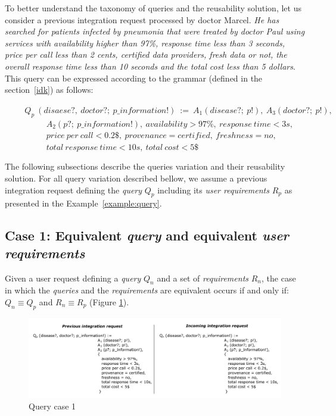 \begin{example}\label{example:query}
To better understand the taxonomy of queries and the reusability solution, let us consider a previous integration request processed by doctor Marcel. \textit{He has searched for patients infected by pneumonia that were treated by doctor Paul using services with availability higher than 97\%, response time less than 3 seconds, price per call less than 2 cents, certified data providers, fresh data or not, the overall response time less than 10 seconds and the total cost less than 5 dollars}. This query can be expressed according to the grammar (defined in the section~\ref{idk}) as follows:
\begin{flushleft}
$\hspace{1cm} Q_{p} \ (disaese?, \ doctor?; \ p\_information!) \ := \ A_{1} (disease?; \ p!), \ A_{3} (doctor?; \ p!),$ \\ 
$ \hspace{2cm} \ A_{2} (p?; \ p\_information!), \ availability > 97\%, \ response \ time < 3s,$ \\ 
$ \hspace{2cm} \ price \ per \ call < 0.2\$, \ provenance = certified, \ freshness = no,$ \\ 
$ \hspace{2cm} \ total \ response \ time < 10s, \ total \ cost < 5\$$
\end{flushleft}
\end{example}
 
The following subsections describe the queries variation and their reusability solution. For all query variation described bellow, we assume a previous integration request defining the \textsl{query} $Q_{p}$ including its \textsl{user requirements} $R_{p}$ as presented in the Example~\ref{example:query}.

\subsection{Case 1: Equivalent \textsl{query} and equivalent \textsl{user requirements}}
Given a user request defining a \textsl{query} $Q_{n}$ and a set of \textsl{requirements} $R_{n}$, the case in which the \textsl{queries} and the \textsl{requirements} are equivalent occurs if and only if: $Q_{n} \equiv Q_{p}$ and $R_{n} \equiv R_{p}$ (Figure \ref{fig:case1}).

\begin{figure}[h!]
\center
\includegraphics[scale=0.85]{figures/query-case-1.pdf}\caption{Query case 1} \label{fig:case1}
\end{figure}

